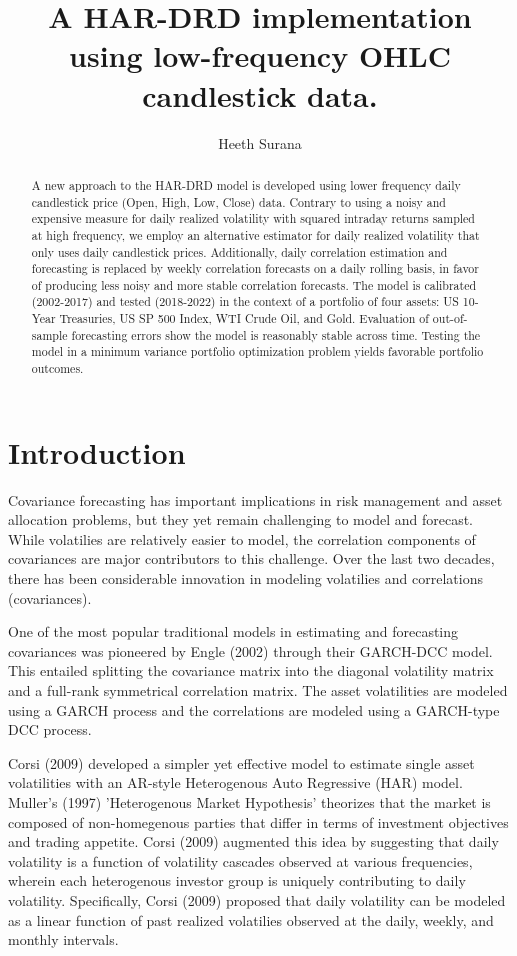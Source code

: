 \documentclass{article}
\title{A HAR-DRD implementation using low-frequency OHLC candlestick data.}
\author{Heeth Surana}
\begin{document}
\doublespacing
\maketitle
\begin{abstract}
    A new approach to the HAR-DRD model is developed using lower frequency 
    daily candlestick price (Open, High, Low, Close) data. Contrary to using 
    a noisy and expensive measure for daily realized volatility with squared intraday
    returns sampled at high frequency, we employ an alternative estimator for daily realized volatility that 
    only uses daily candlestick prices. Additionally, daily correlation estimation and forecasting is
    replaced by weekly correlation forecasts on a daily rolling basis, in favor of producing less noisy and more stable
    correlation forecasts. The model is calibrated (2002-2017) and tested (2018-2022) in the context of a portfolio of four assets:
    US 10-Year Treasuries, US SP 500 Index, WTI Crude Oil, and Gold. Evaluation of out-of-sample forecasting errors show
    the model is reasonably stable across time. Testing the model in a minimum variance portfolio optimization problem
    yields favorable portfolio outcomes.
\end{abstract}
\section{Introduction}


Covariance forecasting has important implications in 
risk management and asset allocation problems, but they yet remain
challenging to model and forecast. While volatilies are relatively easier
to model, the correlation components of covariances are major contributors 
to this challenge. Over the last two decades, there has been considerable 
innovation in modeling volatilies and correlations (covariances).

One of the most popular traditional models in 
estimating and forecasting covariances was pioneered 
by Engle (2002)\cite{Engle2002} through their GARCH-DCC model. This 
entailed splitting the covariance matrix into the 
diagonal volatility matrix and a full-rank 
symmetrical correlation matrix. The asset volatilities 
are modeled using a GARCH process and the correlations 
are modeled using a GARCH-type DCC process.

Corsi (2009)\cite{Corsi2009} developed a simpler yet effective model to 
estimate single asset volatilities with an AR-style Heterogenous Auto Regressive (HAR) model. 
Muller's (1997)\cite{Muller1997} 'Heterogenous Market 
Hypothesis' theorizes that the market is composed of non-homegenous parties that differ
in terms of investment objectives and trading appetite. Corsi (2009) augmented this idea by
suggesting that daily volatility is a function of volatility cascades observed at various frequencies,
wherein each heterogenous investor group is uniquely contributing to daily volatility.
Specifically, Corsi (2009) proposed that daily volatility can 
be modeled as a linear function of past realized 
volatilies observed at the daily, weekly, and monthly 
intervals. 
\end{document}
